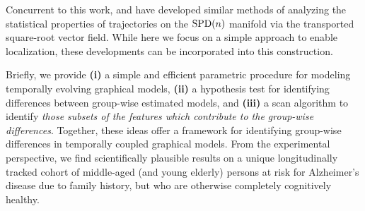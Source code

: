 

Concurrent to this work, \cite{su2014statistical} and \cite{zhang2018rate} have developed similar methods of analyzing the statistical properties of trajectories on the $\text{SPD}(n)$ manifold via the transported square-root vector field. While here we focus on a simple approach to enable localization, these developments can be incorporated into this construction.

Briefly, we provide \textbf{(i)} a simple and efficient parametric procedure for modeling temporally evolving graphical models, \textbf{(ii)} a 
hypothesis test for identifying differences between group-wise estimated models, and \textbf{(iii)} a scan
algorithm to identify {\em those subsets of the features which contribute to the group-wise differences}.
Together, these ideas offer a framework for identifying group-wise differences in temporally coupled graphical models.
From the experimental perspective, we find scientifically plausible results on 
a unique longitudinally tracked cohort of middle-aged (and young elderly) persons at risk for Alzheimer's disease due to family history, 
but who are otherwise completely cognitively healthy.

